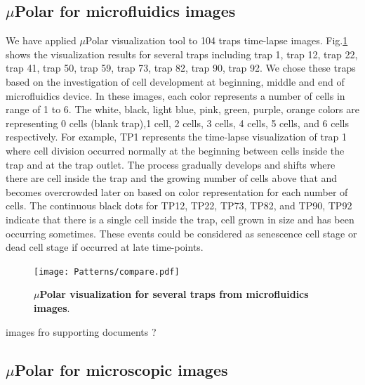 \documentclass[conference]{IEEEtran}
\begin{document}
\subsection{$\mu$Polar for microfluidics images}

We have applied $\mu$Polar visualization tool to   104 traps time-lapse images. Fig.\ref{fig:compare} shows the  visualization results for several traps including trap 1, trap 12, trap 22, trap 41, trap 50, trap 59, trap 73, trap 82, trap 90, trap 92. We chose these traps based on the investigation of cell development at beginning, middle and end of microfluidics device. In these images, each color represents a number of cells in range of 1 to 6. The white, black, light blue, pink, green, purple, orange colors are representing 0 cells (blank trap),1 cell, 2 cells, 3 cells, 4 cells, 5 cells, and 6 cells respectively. For example, TP1 represents the time-lapse visualization of trap 1 where cell division occurred normally at the beginning between cells inside the trap and at the trap outlet.  The process gradually develops and shifts where there are cell inside the trap and the growing number of cells above that and becomes overcrowded later on based on color representation for each number of cells. The continuous black dots for TP12, TP22, TP73, TP82, and TP90, TP92 indicate that there is a single cell inside the trap, cell grown in size and has been occurring sometimes. These events could be considered as senescence cell stage or dead cell stage if occurred at late time-points.         


\begin{figure}
\centering
\texttt{[image: Patterns/compare.pdf]}
\caption{ \textbf{ $\mu$Polar visualization for several traps from microfluidics images}.}
\label{fig:compare}
\end{figure}


images fro supporting documents ? 


\subsection{$\mu$Polar for microscopic images}
\end{document}
